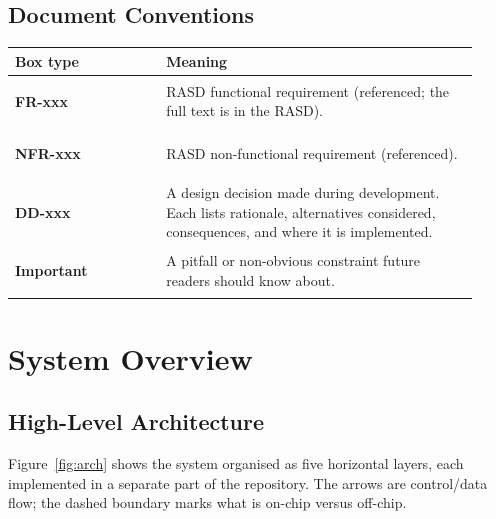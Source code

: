 \documentclass[11pt,a4paper]{article}
\begin{document}
\subsection{Document Conventions}

\begin{center}
\begin{tabular}{p{0.3\linewidth}p{0.62\linewidth}}
\toprule
\rowcolor{tabhead!20}\textbf{Box type} & \textbf{Meaning}\\
\midrule
\colorbox{reqbg}{\strut\quad\textbf{FR-xxx}\quad}     & RASD functional requirement (referenced; the full text is in the RASD).\\
\colorbox{nfrbg}{\strut\quad\textbf{NFR-xxx}\quad}    & RASD non-functional requirement (referenced).\\
\colorbox{ddbg}{\strut\quad\textbf{DD-xxx}\quad}      & A design decision made during development. Each lists rationale, alternatives considered, consequences, and where it is implemented.\\
\colorbox{warnbg}{\strut\quad\textbf{Important}\quad} & A pitfall or non-obvious constraint future readers should know about.\\
\bottomrule
\end{tabular}
\end{center}

\section{System Overview}

\subsection{High-Level Architecture}

Figure~\ref{fig:arch} shows the system organised as five horizontal
layers, each implemented in a separate part of the repository. The
arrows are control/data flow; the dashed boundary marks what is
on-chip versus off-chip.
\end{document}
